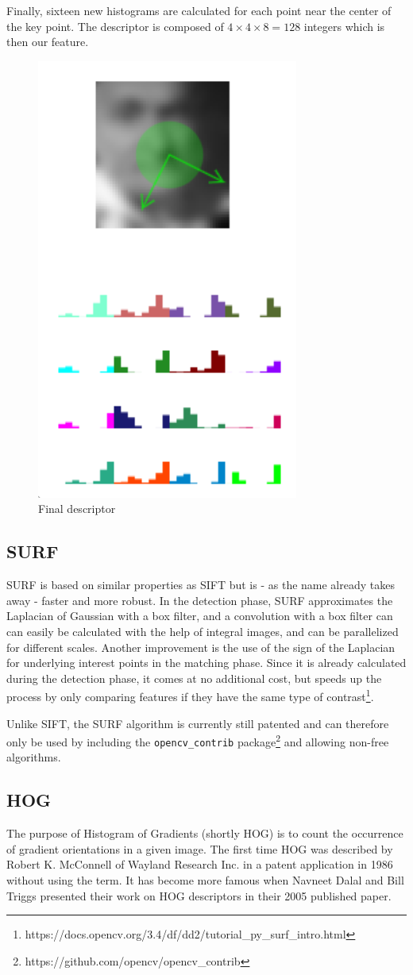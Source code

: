 \documentclass{scrartcl}
\begin{document}
\begin{enumerate}
        Finally, sixteen new histograms are calculated for each point near the center of the key point. The descriptor is composed of $4 \times 4 \times 8=128$ integers which is then our feature.

        \begin{figure}[H]
            \centering
            \includegraphics[width=0.2\linewidth]{img/sift5}
            \caption{Final descriptor}%
            \label{fig:sift5}
        \end{figure}
\end{enumerate}


\subsection{SURF}
SURF is based on similar properties as SIFT but is - as the name already takes away - faster and more robust. In the detection phase, SURF approximates the Laplacian of Gaussian with a box filter, and a convolution with a box filter can can easily be calculated with the help of integral images, and can be parallelized for different scales.
Another improvement is the use of the sign of the Laplacian for underlying interest points in the matching phase. Since it is already calculated during the detection phase, it comes at no additional cost, but speeds up the process by only comparing features if they have the same type of contrast\footnote{https://docs.opencv.org/3.4/df/dd2/tutorial\_py\_surf\_intro.html}.

Unlike SIFT, the SURF algorithm is currently still patented and can therefore only be used by including the \texttt{opencv\_contrib} package\footnote{https://github.com/opencv/opencv\_contrib} and allowing non-free algorithms.

\subsection{HOG}

The purpose of Histogram of Gradients (shortly HOG) is to count the occurrence of gradient orientations in a given image. The first time HOG was described by Robert K. McConnell of Wayland Research Inc. in a patent application in 1986 without using the term. It has become more famous when Navneet Dalal and Bill Triggs \cite{Hog_article} presented their work on HOG descriptors in their 2005 published paper.
\end{document}
